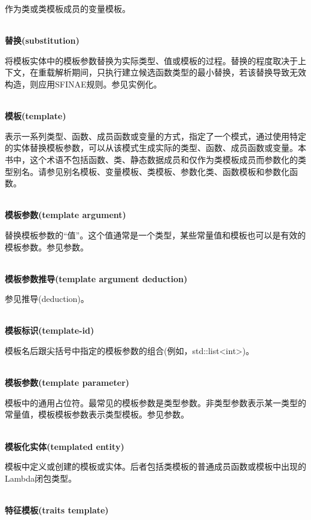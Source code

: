 作为类或类模板成员的变量模板。

\hspace*{\fill} \\ %
\noindent
\textbf{替换(substitution)}

将模板实体中的模板参数替换为实际类型、值或模板的过程。替换的程度取决于上下文，在重载解析期间，只执行建立候选函数类型的最小替换，若该替换导致无效构造，则应用SFINAE规则。参见实例化。

\hspace*{\fill} \\ %
\noindent
\textbf{模板(template)}

表示一系列类型、函数、成员函数或变量的方式，指定了一个模式，通过使用特定的实体替换模板参数，可以从该模式生成实际的类型、函数、成员函数或变量。本书中，这个术语不包括函数、类、静态数据成员和仅作为类模板成员而参数化的类型别名。请参见别名模板、变量模板、类模板、参数化类、函数模板和参数化函数。

\hspace*{\fill} \\ %
\noindent
\textbf{模板参数(template argument)}

替换模板参数的“值”。这个值通常是一个类型，某些常量值和模板也可以是有效的模板参数。参见参数。

\hspace*{\fill} \\ %
\noindent
\textbf{模板参数推导(template argument deduction)}

参见推导(deduction)。

\hspace*{\fill} \\ %
\noindent
\textbf{模板标识(template-id)}

模板名后跟尖括号中指定的模板参数的组合(例如，std::list<int>)。

\hspace*{\fill} \\ %
\noindent
\textbf{模板参数(template parameter)}

模板中的通用占位符。最常见的模板参数是类型参数。非类型参数表示某一类型的常量值，模板模板参数表示类型模板。参见参数。

\hspace*{\fill} \\ %
\noindent
\textbf{模板化实体(templated entity)}

模板中定义或创建的模板或实体。后者包括类模板的普通成员函数或模板中出现的Lambda闭包类型。

\hspace*{\fill} \\ %
\noindent
\textbf{特征模板(traits template)}

